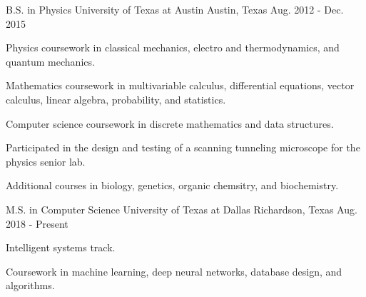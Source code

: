 

\begin{cventries}

  \cventry
    {B.S. in Physics} %
    {University of Texas at Austin} %
    {Austin, Texas} %
    {Aug. 2012 - Dec. 2015} %
    {
      \begin{cvitems} %
        \item {
			Physics coursework in classical mechanics, electro and
			thermodynamics, and quantum mechanics.
		}
        \item {
			Mathematics coursework in multivariable calculus,
			differential equations, vector calculus, linear algebra,
			probability, and statistics.
		}
        \item {
			Computer science coursework in discrete mathematics and
			data structures.
		}
        \item {
			Participated in the design and testing of a scanning
			tunneling microscope for the physics senior lab.
		}
        \item {
			Additional courses in biology, genetics, organic
			chemsitry, and biochemistry.
		}
      \end{cvitems}
    }

  \cventry
    {M.S. in Computer Science} %
    {University of Texas at Dallas} %
    {Richardson, Texas} %
    {Aug. 2018 - Present} %
    {
      \begin{cvitems} %
        \item {Intelligent systems track.}
        \item {
			Coursework in machine learning, deep neural networks,
			database design, and algorithms.
		}
      \end{cvitems}
    }

\end{cventries}
